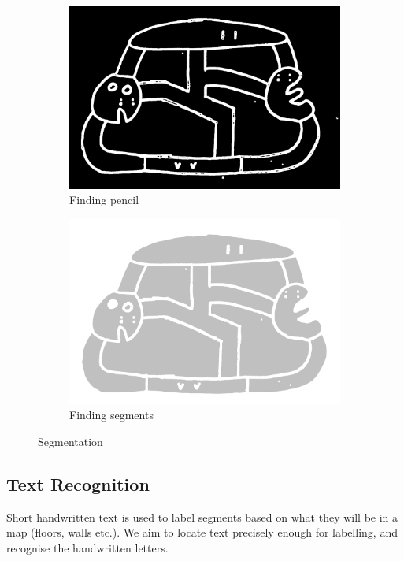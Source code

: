 \documentclass{IEEEtran}
\begin{document}
\begin{figure}[h]
     \centering
     \begin{subfigure}[b]{0.24\textwidth}
         \centering
         \includegraphics[width=\textwidth]{s1}
         \caption{Finding pencil}
         \label{fig:s1}
     \end{subfigure}
     \hfill
     \begin{subfigure}[b]{0.24\textwidth}
         \centering
         \includegraphics[width=\textwidth]{s2}
         \caption{Finding segments}
         \label{fig:s2}
     \end{subfigure}
        \caption{Segmentation}
        \label{fig:seg}
\end{figure}

\subsection{Text Recognition}
Short handwritten text is used to label segments based on what they will be in a map (floors, walls etc.). We aim to locate text precisely enough for labelling, and recognise the handwritten letters. 
\end{document}
